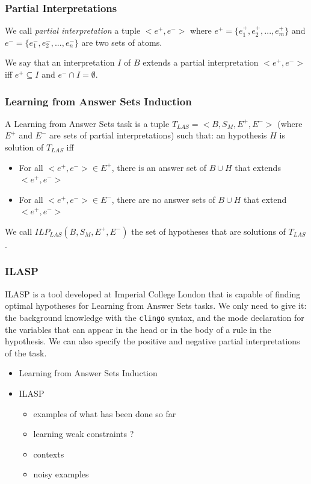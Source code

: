 \subsubsection{Partial Interpretations}

We call \textit{partial interpretation} a tuple $<e^+,e^->$ where $e^+=\{e^+_1,e^+_2,...,e^+_m\}$ and $e^-=\{e^-_1,e^-_2,...,e^-_n\}$ are two sets of atoms.

\smallskip

We say that an interpretation $I$ of $B$ extends a partial interpretation $<e^+,e^->$ iff $e^+ \subseteq I$ and $e^- \cap I = \emptyset$.

\subsubsection{Learning from Answer Sets Induction}

A Learning from Answer Sets task is a tuple $T_{LAS}=<B, S_M, E^+, E^->$ (where $E^+$ and $E^-$ are sets of partial interpretations) such that: an hypothesis $H$ is solution of $T_{LAS}$ iff 
\begin{itemize}
\item For all  $<e^+,e^->\in E^+$, there is an answer set of $B\cup H$ that extends $<e^+,e^->$
\item For all  $<e^+,e^->\in E^-$, there are no answer sets of $B\cup H$ that extend $<e^+,e^->$
\end{itemize}

We call $ILP_{LAS}(B,S_M,E^+,E^-)$ the set of hypotheses that are solutions of $T_{LAS}$. 

\subsubsection{ILASP}

ILASP is a tool developed at Imperial College London that is capable of finding optimal hypotheses for Learning from Answer Sets tasks. We only need to give it: the background knowledge with the \texttt{clingo} syntax, and the mode declaration for the variables that can appear in the head or in the body of a rule in the hypothesis. We can also specify the positive and negative partial interpretations of the task.

\begin{itemize}
\item Learning from Answer Sets Induction
\item ILASP
\begin{itemize}
\item examples of what has been done so far
\item learning weak constraints ?
\item contexts
\item noisy examples
\end{itemize}
\end{itemize}